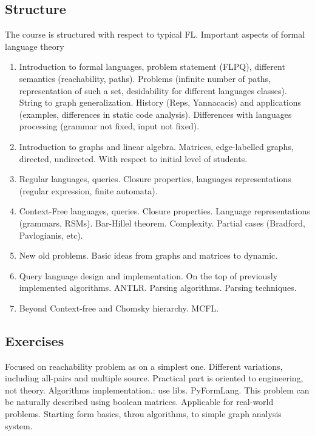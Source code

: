 \documentclass[sigconf]{acmart}
\begin{document}
\subsection{Structure}

The course is structured with respect to typical FL. 
Important aspects of formal language theory  
\begin{enumerate}
  \item Introduction to formal languages, problem statement (FLPQ), different semantics (reachability, paths). 
  Problems (infinite number of paths, representation of such a set, desidability for different languages classes). 
  String to graph generalization. 
  History (Reps, Yannacacis) and applications (examples, differences in static code analysis). 
  Differences with languages processing (grammar not fixed, input not fixed).
  \item Introduction to graphs and linear algebra. 
  Matrices, edge-labelled graphs, directed, undirected. 
  With respect to initial level of students.
  \item Regular languages, queries. Closure properties, languages representations (regular expression, finite automata).
  \item Context-Free languages, queries. 
  Closure properties. 
  Language representations (grammars, RSMs). 
  Bar-Hillel theorem. 
  Complexity. 
  Partial cases (Bradford, Pavlogianis, etc).
  \item New old problems. Basic ideas from graphs and matrices to dynamic. 
  \item Query language design and implementation. On the top of previously implemented algorithms. ANTLR. Parsing algorithms. Parsing techniques.
  \item Beyond Context-free and Chomsky hierarchy. MCFL.
\end{enumerate}

\subsection{Exercises}

Focused on reachability problem as on a simplest one. 
Different variations, including all-pairs and multiple source.
Practical part is oriented to engineering, not theory. Algorithms implementation.: use libs. PyFormLang.
This problem can be naturally described using boolean matrices. 
Applicable for real-world problems. 
Starting form basics, throu algorithms, to simple graph analysis system.
\end{document}
